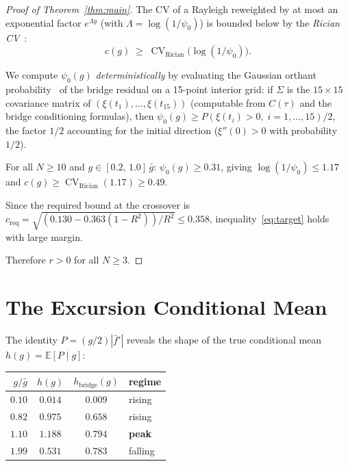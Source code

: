 \documentclass[11pt]{article}
\DeclareMathOperator{\CV}{CV}
\begin{document}
\begin{proof}[Proof of Theorem~\ref{thm:main}]
The CV of a Rayleigh reweighted by at most an exponential factor
$e^{\Lambda y}$ (with $\Lambda = \log(1/\psi_0)$) is bounded below by the
\emph{Rician CV}~\cite{Rice1945}:
\begin{equation}\label{eq:rician}
c(g) \;\geq\; \CV_{\mathrm{Rician}}\bigl(\log(1/\psi_0)\bigr).
\end{equation}

We compute $\psi_0(g)$ \emph{deterministically} by evaluating the
Gaussian orthant probability~\cite{Genz1992} of the bridge residual on a
15-point interior grid: if
$\Sigma$ is the $15 \times 15$ covariance matrix of
$(\xi(t_1), \ldots, \xi(t_{15}))$ (computable from $C(\tau)$ and the bridge
conditioning formulas), then
$\psi_0(g) \geq P(\xi(t_i) > 0,\; i = 1, \ldots, 15) / 2$,
the factor $1/2$ accounting for the initial direction ($\xi''(0) > 0$ with
probability $1/2$).

For all $N \geq 10$ and $g \in [0.2,\, 1.0]\,\bar{g}$:
$\psi_0(g) \geq 0.31$,
giving $\log(1/\psi_0) \leq 1.17$ and
$c(g) \geq \CV_{\mathrm{Rician}}(1.17) \geq 0.49$.

Since the required bound at the crossover is
$c_{\mathrm{req}} = \sqrt{(0.130 - 0.363(1{-}R^2))/R^2} \leq 0.358$,
inequality~\eqref{eq:target} holds with large margin.

\medskip
Therefore $r > 0$ for all $N \geq 3$.
\end{proof}


\section{The Excursion Conditional Mean}\label{sec:htrue}

The identity $P = (g/2)|\bar{f}'|$ reveals the shape of the true
conditional mean $h(g) = \mathbb{E}[P \mid g]$:

\begin{center}
\begin{tabular}{rccl}
\toprule
$g/\bar{g}$ & $h(g)$ & $h_{\mathrm{bridge}}(g)$ & regime \\
\midrule
$0.10$ & $0.014$ & $0.009$ & rising \\
$0.82$ & $0.975$ & $0.658$ & rising \\
$\mathbf{1.10}$ & $\mathbf{1.188}$ & $\mathbf{0.794}$ & \textbf{peak} \\
$1.99$ & $0.531$ & $0.783$ & falling \\
\bottomrule
\end{tabular}
\end{center}
\end{document}
